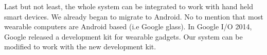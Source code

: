 \bigskip
Last but not least, the whole system can be integrated to work with hand held smart devices. We already began to migrate to Android. No to mention that most wearable computers are Android based (i.e Google glass). In Google I/O 2014, Google released a development kit for wearable gadgets. Our system can be modified to work with the new development kit.
